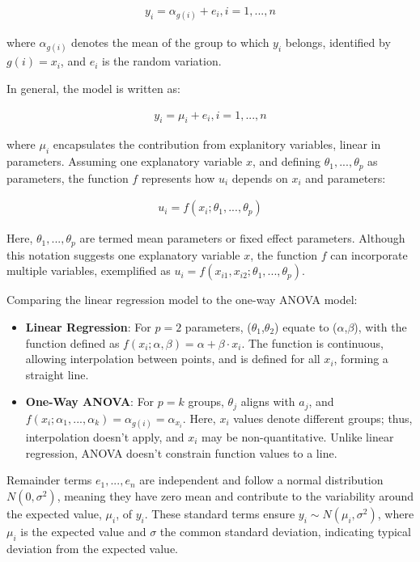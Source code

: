 \documentclass{article}
\begin{document}
\begin{align*}
y_i = \alpha_{g(i)} + e_i, i=1,...,n
\end{align*}

where $\alpha_{g(i)}$ denotes the mean of the group to which $y_i$ belongs, identified by $g(i)=x_i$, and $e_i$ is the random variation.

In general, the model is written as:

\begin{align*}
y_i=\mu_i + e_i, i=1,...,n
\end{align*}

where $\mu_i$ encapsulates the contribution from explanitory variables, linear in parameters. Assuming one explanatory variable $x$, and defining $\theta_1,...,\theta_p$ as parameters, the function $f$ represents how $u_i$ depends on $x_i$ and parameters:

\begin{align*}
u_i=f(x_i;\theta_1,...,\theta_p)
\end{align*}

Here, $\theta_1,...,\theta_p$ are termed mean parameters or fixed effect parameters. Although this notation suggests one explanatory variable $x$, the function $f$ can incorporate multiple variables, exemplified as $u_i=f(x_{i1},x_{i2};\theta_1,...,\theta_p)$.

Comparing the linear regression model to the one-way ANOVA model:

\begin{itemize}
    \item \textbf{Linear Regression}: For $p=2$ parameters, ($\theta_1$,$\theta_2$) equate to ($\alpha$,$\beta$), with the function defined as $f(x_i;\alpha,\beta)=\alpha+\beta \cdot x_i$. The function is continuous, allowing interpolation between points, and is defined for all $x_i$, forming a straight line.
    \item \textbf{One-Way ANOVA}: For $p=k$ groups, $\theta_j$ aligns with $a_j$, and $f(x_i;\alpha_1,...,\alpha_k)=\alpha_{g(i)}=\alpha_{x_i}$. Here, $x_i$ values denote different groups; thus, interpolation doesn't apply, and $x_i$ may be non-quantitative. Unlike linear regression, ANOVA doesn't constrain function values to a line.
\end{itemize}

Remainder terms $e_1,...,e_n$ are independent and follow a normal distribution $N(0,\sigma^2)$, meaning they have zero mean and contribute to the variability around the expected value, $\mu_i$, of $y_i$. These standard terms ensure $y_i \sim N(\mu_i, \sigma^2)$, where $\mu_i$ is the expected value and $\sigma$ the common standard deviation, indicating typical deviation from the expected value.
\end{document}
